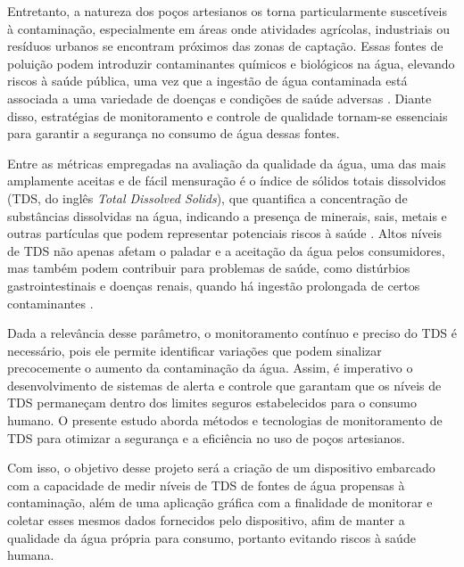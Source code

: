 \documentclass[12pt]{article}
\begin{document}
Entretanto, a natureza dos poços artesianos os torna particularmente suscetíveis à contaminação, especialmente em áreas onde atividades agrícolas, industriais ou resíduos urbanos se encontram próximos das zonas de captação. Essas fontes de poluição podem introduzir contaminantes químicos e biológicos na água, elevando riscos à saúde pública, uma vez que a ingestão de água contaminada está associada a uma variedade de doenças e condições de saúde adversas \cite{pushpalatha2022total}. Diante disso, estratégias de monitoramento e controle de qualidade tornam-se essenciais para garantir a segurança no consumo de água dessas fontes.

Entre as métricas empregadas na avaliação da qualidade da água, uma das mais amplamente aceitas e de fácil mensuração é o índice de sólidos totais dissolvidos (TDS, do inglês \textit{Total Dissolved Solids}), que quantifica a concentração de substâncias dissolvidas na água, indicando a presença de minerais, sais, metais e outras partículas que podem representar potenciais riscos à saúde \cite{sherrard1987total}. Altos níveis de TDS não apenas afetam o paladar e a aceitação da água pelos consumidores, mas também podem contribuir para problemas de saúde, como distúrbios gastrointestinais e doenças renais, quando há ingestão prolongada de certos contaminantes \cite{edition2011guidelines}.

Dada a relevância desse parâmetro, o monitoramento contínuo e preciso do TDS é necessário, pois ele permite identificar variações que podem sinalizar precocemente o aumento da contaminação da água. Assim, é imperativo o desenvolvimento de sistemas de alerta e controle que garantam que os níveis de TDS permaneçam dentro dos limites seguros estabelecidos para o consumo humano. O presente estudo aborda métodos e tecnologias de monitoramento de TDS para otimizar a segurança e a eficiência no uso de poços artesianos.


Com isso, o objetivo desse projeto será a criação de um dispositivo embarcado com a capacidade de medir níveis de TDS de fontes de água propensas à contaminação, além de uma aplicação gráfica com a finalidade de monitorar e coletar esses mesmos dados fornecidos pelo dispositivo, afim de manter a qualidade da água própria para consumo, portanto evitando riscos à saúde humana.
\end{document}
